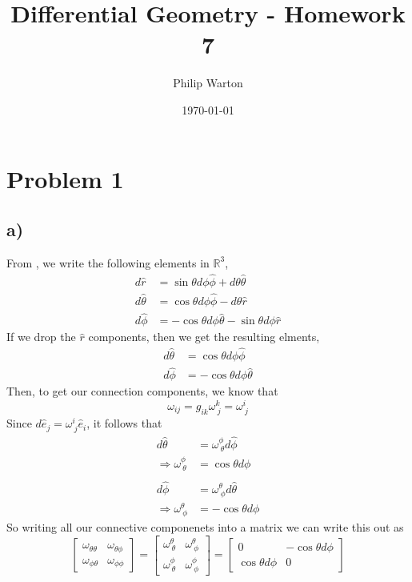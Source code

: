 \documentclass{article}
\theoremstyle{definition}
\begin{document}
\title{Differential Geometry - Homework 7}
\author{Philip Warton}
\date{\today}
\maketitle
\section*{Problem 1}
\subsection*{a)}
From , we write the following elements in $\mathbb{R}^3$,
\begin{align*}
    d\hat r & = \sin\theta d\phi\hat\phi + d\theta\hat\theta\\
    d\hat\theta&=\cos\theta d\phi\hat\phi - d\theta\hat r\\
    d\hat\phi&=-\cos\theta d\phi\hat\theta - \sin\theta d\phi\hat r
\end{align*}
If we drop the $\hat r$ components, then we get the resulting elments,
\begin{align*}
    d\hat\theta&=\cos\theta d\phi\hat\phi\\
    d\hat\phi&=-\cos\theta d\phi\hat\theta
\end{align*}
Then, to get our connection components, we know that 
\[
    \omega_{ij} = g_{ik}\omega^k_{\ j} = \omega^i_{\ j}
\]
Since $d\hat e_j = \omega^i_{\ j} \hat e_i$, it follows that
\begin{align*}
    d \hat \theta &= \omega^\phi_{\ \theta} d\hat\phi\\
    \Longrightarrow \omega^\phi_{\ \theta} &= \cos\theta d\phi \\\\
    d\hat\phi &= \omega^\theta_{\ \phi} d\hat\theta \\
    \Longrightarrow \omega^\theta_{\ \phi} &= -\cos\theta d\phi
\end{align*}
So writing all our connective componenets into a matrix
we can write this out as
\[
    \begin{bmatrix}
        \omega_{\theta \theta} & \omega_{\theta \phi} \\
        \omega_{\phi \theta} & \omega_{\phi \phi}
    \end{bmatrix} =
    \begin{bmatrix}
        \omega^{\theta}_{\ \theta} & \omega^{\theta}_{\ \phi} \\
        \omega^{\phi}_{\ \theta} & \omega^{\phi}_{\ \phi}
    \end{bmatrix} =
    \begin{bmatrix}
        0 & -\cos\theta d\phi \\
        \cos\theta d\phi & 0
    \end{bmatrix}
\]
\end{document}
